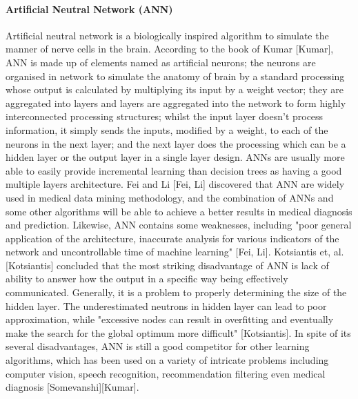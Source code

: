 \documentclass[runningheads]{llncs}
\begin{document}
\paragraph{Artificial Neutral Network (ANN)\\}
Artificial neutral network is a biologically inspired algorithm to simulate the manner of nerve cells in the brain. According to the book of Kumar [Kumar], ANN is made up of elements named as artificial neurons; the neurons are organised in network to simulate the anatomy of brain by a standard processing whose output is calculated by multiplying its input by a weight vector; they are aggregated into layers and layers are aggregated into the network to form highly interconnected processing structures; whilst the input layer doesn't process information, it simply sends the inputs, modified by a weight, to each of the neurons in the next layer; and the next layer does the processing which can be a hidden layer or the output layer in a single layer design. ANNs are usually more able to easily provide incremental learning than decision trees as having a good multiple layers architecture. Fei and Li [Fei, Li] discovered that ANN are widely used in medical data mining methodology, and the combination of ANNs and some other algorithms will be able to achieve a better results in medical diagnosis and prediction. Likewise, ANN contains some weaknesses, including "poor general application of the architecture, inaccurate analysis for various indicators of the network and uncontrollable time of machine learning" [Fei, Li]. Kotsiantis et, al. [Kotsiantis] concluded that the most striking disadvantage of ANN is lack of ability to answer how the output in a specific way being effectively communicated. Generally, it is a problem to properly determining the size of the hidden layer. The underestimated neutrons in hidden layer can lead to poor approximation, while "excessive nodes can result in overfitting and eventually make the search for the global optimum more difficult" [Kotsiantis]. In spite of its several disadvantages,  ANN is still a good competitor for other learning algorithms, which has been used on a variety of intricate problems including computer vision, speech recognition, recommendation filtering even medical diagnosis [Somevanshi][Kumar].
%
\end{document}
